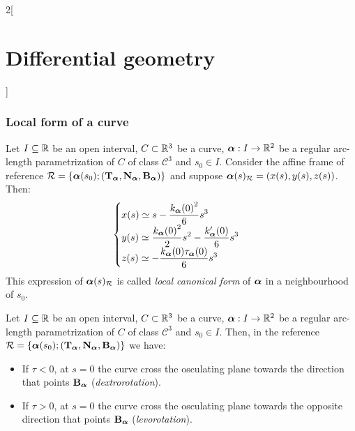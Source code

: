 \documentclass[../../../main.tex]{subfiles}
\begin{document}
\begin{multicols}{2}[\section{Differential geometry}]
  \subsubsection{Local form of a curve}
  \begin{definition}
    Let $I\subseteq\mathbb{R}$ be an open interval, $C\subset\mathbb{R}^3$ be a curve, $\boldsymbol{\mathrm{\alpha}}:I\rightarrow\mathbb{R}^2$ be a regular arc-length parametrization of $C$ of class $\mathcal{C}^3$ and $s_0\in I$. Consider the affine frame of reference $\mathcal{R}=\{\boldsymbol{\mathrm{\alpha}}(s_0);({\boldsymbol{\mathrm{T}}_{\boldsymbol{\mathrm{\alpha}}}},{\boldsymbol{\mathrm{N}}_{\boldsymbol{\mathrm{\alpha}}}},{\boldsymbol{\mathrm{B}}_{\boldsymbol{\mathrm{\alpha}}}})\}$ and suppose $\boldsymbol{\mathrm{\alpha}}(s)_{\mathcal{R}}=(x(s),y(s),z(s))$. Then:
    $$
      \begin{cases}
        \displaystyle x(s)\simeq s-\frac{{k_{\boldsymbol{\mathrm{\alpha}}}(0)}^2}{6}s^3                              \\
        \displaystyle y(s)\simeq \frac{{k_{\boldsymbol{\mathrm{\alpha}}}(0)}^2}{2}s^2-\frac{k_{\boldsymbol{\mathrm{\alpha}}}'(0)}{6}s^3 \\
        \displaystyle z(s)\simeq -\frac{k_{\boldsymbol{\mathrm{\alpha}}}(0){\tau_{\boldsymbol{\mathrm{\alpha}}}}(0)}{6}s^3
      \end{cases}
    $$
    This expression of $\boldsymbol{\mathrm{\alpha}}(s)_{\mathcal{R}}$ is called \emph{local canonical form} of $\boldsymbol{\mathrm{\alpha}}$ in a neighbourhood of $s_0$.
  \end{definition}
  \begin{corollary}
    Let $I\subseteq\mathbb{R}$ be an open interval, $C\subset\mathbb{R}^3$ be a curve, $\boldsymbol{\mathrm{\alpha}}:I\rightarrow\mathbb{R}^2$ be a regular arc-length parametrization of $C$ of class $\mathcal{C}^3$ and $s_0\in I$. Then, in the reference $\mathcal{R}=\{\boldsymbol{\mathrm{\alpha}}(s_0);({\boldsymbol{\mathrm{T}}_{\boldsymbol{\mathrm{\alpha}}}},{\boldsymbol{\mathrm{N}}_{\boldsymbol{\mathrm{\alpha}}}},{\boldsymbol{\mathrm{B}}_{\boldsymbol{\mathrm{\alpha}}}})\}$ we have:
    \begin{itemize}
      \item If $\tau <0$, at $s=0$ the curve cross the osculating plane towards the direction that points ${\boldsymbol{\mathrm{B}}_{\boldsymbol{\mathrm{\alpha}}}}$ (\emph{dextrorotation}).
      \item If $\tau >0$, at $s=0$ the curve cross the osculating plane towards the opposite direction that points ${\boldsymbol{\mathrm{B}}_{\boldsymbol{\mathrm{\alpha}}}}$ (\emph{levorotation}).
    \end{itemize}
  \end{corollary}

\end{multicols}
\end{document}
